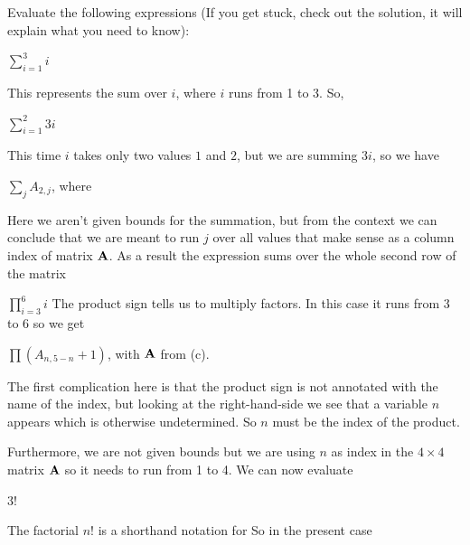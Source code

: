 
Evaluate the following expressions (If you get stuck, check out the solution, it will explain what you need to know): 

\subquestion $\sum_{i=1}^3 i$

\solution 
This represents the sum over $i$, where $i$ runs from 1 to 3. So, 

\subquestion $\sum_{i=1}^2 3i$

\solution 
This time $i$ takes only two values $1$ and $2$, but we are summing $3i$, so we have

\subquestion $\sum_j A_{2,j}$, where 

\solution 
Here we aren't given bounds for the summation, but from the context we can conclude that we are meant to run $j$ over all values that make sense as a column index of matrix ${\bf A}$.
As a result the expression sums over the whole second row of the matrix 

\subquestion
$\prod_{i=3}^6 i$ 
\solution
The product sign tells us to multiply factors. In this case it runs from 3 to 6 so we get 

\subquestion
$\prod (A_{n,5-n}+1)$, with $\bf A$ from (c).

\solution
The first complication here is that the product sign is not annotated with the name of the index, but looking at the right-hand-side we see that a variable $n$ appears which is otherwise undetermined. So $n$ must be the index of the product. 

Furthermore, we are not given bounds but we are using $n$ as index in the $4\times 4$ matrix $\bf A$ so it needs to run from 1 to 4. We can now evaluate

\subquestion $3!$

\solution 
The factorial $n!$ is a shorthand notation for
So in the present case 

